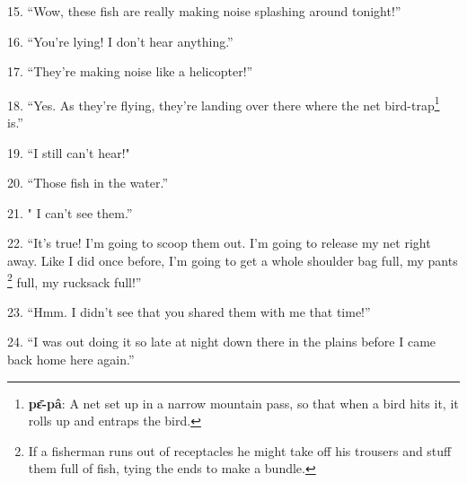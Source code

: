 15. ``Wow, these fish are really making noise splashing around tonight!''

16. ``You're lying! I don't hear anything.''

17. ``They're making noise like a helicopter!''

18. ``Yes. As they're flying, they're landing over there where the net bird-trap\footnote{\textbf{pɛ̄-pâ}: A net set up in a narrow mountain pass, so that when a bird hits it, it rolls up and entraps the bird.}
is.''

19. ``I still can't hear!"

20. ``Those fish in the water.''

21. " I can't see them.''

22. ``It's true! I'm going to scoop them out. I'm going to release my net right
away. Like I did once before, I'm going to get a whole shoulder bag full, my pants
\footnote{If a fisherman runs out of receptacles he might take off his trousers and stuff them full of fish, tying the ends to make a bundle.} full, my rucksack full!''

23. ``Hmm. I didn't see that you shared them with me that time!''

24. ``I was out doing it so late at night down there in the plains before I came
back home here again.''

